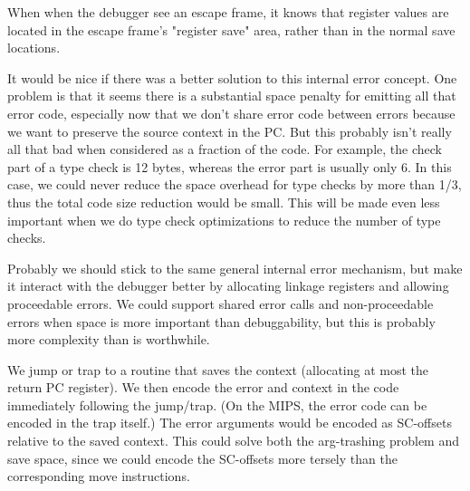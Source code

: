 When when the debugger see an escape frame, it knows that register values are
located in the escape frame's "register save" area, rather than in the normal
save locations.

It would be nice if there was a better solution to this internal error concept.
One problem is that it seems there is a substantial space penalty for emitting
all that error code, especially now that we don't share error code between
errors because we want to preserve the source context in the PC.  But this
probably isn't really all that bad when considered as a fraction of the code.
For example, the check part of a type check is 12 bytes, whereas the error part
is usually only 6.  In this case, we could never reduce the space overhead for
type checks by more than 1/3, thus the total code size reduction would be
small.  This will be made even less important when we do type check
optimizations to reduce the number of type checks.

Probably we should stick to the same general internal error mechanism, but make
it interact with the debugger better by allocating linkage registers and
allowing proceedable errors.  We could support shared error calls and
non-proceedable errors when space is more important than debuggability, but
this is probably more complexity than is worthwhile.

We jump or trap to a routine that saves the context (allocating at most the
return PC register).  We then encode the error and context in the code
immediately following the jump/trap.  (On the MIPS, the error code can be
encoded in the trap itself.)  The error arguments would be encoded as
SC-offsets relative to the saved context.  This could solve both the
arg-trashing problem and save space, since we could encode the SC-offsets more
tersely than the corresponding move instructions.
